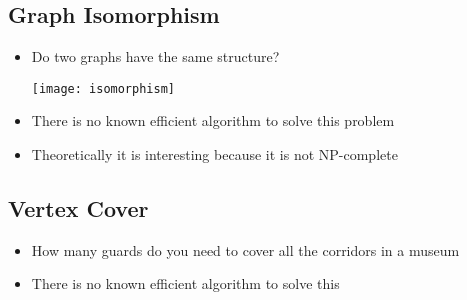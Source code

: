 
\begin{slide}
\section{Graph Isomorphism}

\begin{PauseHighLight}
  \begin{itemize}
  \item Do two graphs have the same structure?\pause
    \begin{center}
      \texttt{[image: isomorphism]}
    \end{center}
  \item There is no known efficient algorithm to solve this
    problem\pause
  \item Theoretically it is interesting because it is not NP-complete\pause
  \end{itemize}
\end{PauseHighLight}

\end{slide}


\begin{slide}
\section[-2]{Vertex Cover}

\pausebuild
\color{TwoColor}
\begin{itemize}
\item How many guards do you need to cover all the corridors in a
  museum\pauseh
  \vspace*{-1cm}
  \begin{center}\color{TextColor}
    \pause
  \end{center}
  \vspace*{-1cm}
\color{TwoColor}
\item There is no known efficient algorithm to solve this\pauseh
\end{itemize}

\end{slide}



